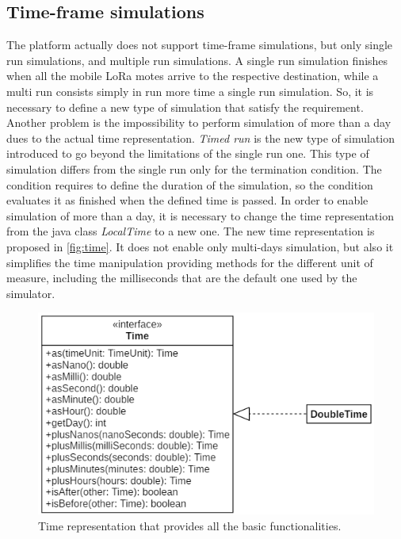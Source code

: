 \subsection*{Time-frame simulations}
The platform actually does not support time-frame simulations, but only single run simulations, and multiple run simulations.
A single run simulation finishes when all the mobile LoRa motes arrive to the respective destination, while a multi run consists simply in run more time a single run simulation.
So, it is necessary to define a new type of simulation that satisfy the requirement.
Another problem is the impossibility to perform simulation of more than a day dues to the actual time representation.
\textit{Timed run} is the new type of simulation introduced to go beyond the limitations of the single run one. 
This type of simulation differs from the single run only for the termination condition. 
The condition requires to define the duration of the simulation, so the condition evaluates it as finished when the defined time is passed.
In order to enable simulation of more than a day, it is necessary to change the time representation from the java class \mbox{\textit{LocalTime}} to a new one.
The new time representation is proposed in \autoref{fig:time}.
It does not enable only multi-days simulation, but also it simplifies the time manipulation providing methods for the different unit of measure, including the milliseconds that are the default one used by the simulator. 
\begin{figure}[h]
    \centering
    \includegraphics{figures/time.png}
    \caption[Time representation in DingNet simulator]{Time representation that provides all the basic functionalities.}
    \label{fig:time}
\end{figure}

